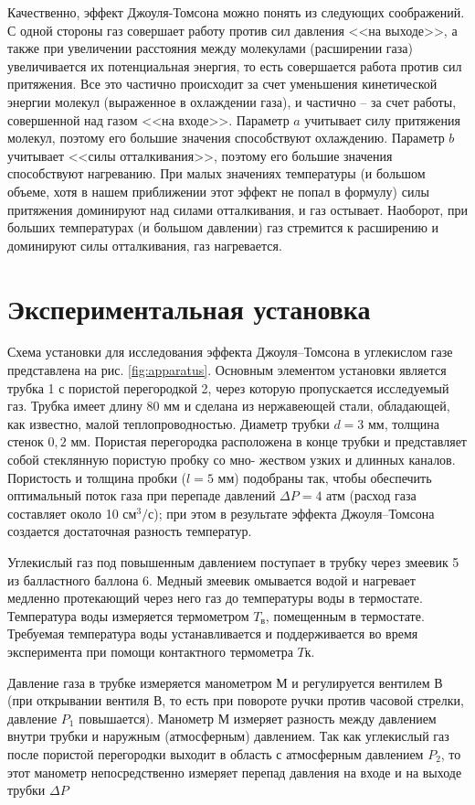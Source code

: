 \documentclass[a4paper,12pt]{article}
\begin{document}
  Качественно, эффект Джоуля-Томсона можно понять из следующих соображений. С одной стороны газ совершает работу против сил давления <<на выходе>>, а также при увеличении расстояния между молекулами (расширении газа) увеличивается их потенциальная энергия, то есть совершается работа против сил притяжения. Все это частично происходит за счет уменьшения кинетической энергии молекул (выраженное в охлаждении газа), и частично -- за счет работы, совершенной над газом <<на входе>>. Параметр $a$ учитывает силу притяжения молекул, поэтому его большие значения способствуют охлаждению. Параметр $b$ учитывает <<силы отталкивания>>, поэтому его большие значения способствуют нагреванию. При малых значениях температуры (и большом объеме, хотя в нашем приближении этот эффект не попал в формулу) силы притяжения доминируют над силами отталкивания, и газ остывает. Наоборот, при больших температурах (и большом давлении) газ стремится к расширению и доминируют силы отталкивания, газ нагревается.

\section{Экспериментальная установка}
  Схема установки для исследования эффекта Джоуля–Томсона в углекислом газе представлена на рис. \ref{fig:apparatus}. Основным элементом установки является трубка 1 с пористой перегородкой 2, через которую пропускается исследуемый газ. Трубка имеет длину 80 мм и сделана из нержавеющей стали, обладающей, как известно, малой теплопроводностью. Диаметр трубки $d = 3$ мм, толщина стенок $0,2$ мм. Пористая перегородка расположена в конце трубки и представляет собой стеклянную пористую пробку со мно- жеством узких и длинных каналов. Пористость и толщина пробки ($l = 5$ мм) подобраны так, чтобы обеспечить оптимальный поток газа при перепаде давлений $\Delta P = 4$ атм (расход газа составляет около 10 $см^3/с$); при этом в результате эффекта Джоуля–Томсона создается достаточная разность температур.

  Углекислый газ под повышенным давлением поступает в трубку через змеевик 5 из балластного баллона 6. Медный змеевик омывается водой и нагревает медленно протекающий через него газ до температуры воды в термостате. Температура воды измеряется термометром $T_в$, помещенным в термостате. Требуемая температура воды устанавливается и поддерживается во время эксперимента при помощи контактного термометра $Tк$.

  Давление газа в трубке измеряется манометром М и регулируется вентилем В (при открывании вентиля В, то есть  при повороте ручки против часовой стрелки, давление $P_1$ повышается). Манометр М измеряет разность между давлением внутри трубки и наружным (атмосферным) давлением. Так как углекислый газ после пористой перегородки выходит в область с атмосферным давлением $P_2$, то этот манометр непосредственно измеряет перепад давления на входе и на выходе трубки $\Delta P$
\end{document}
